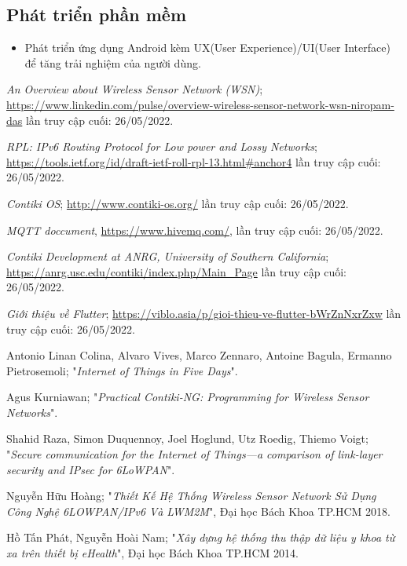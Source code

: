 \documentclass{report}
\begin{document}
\subsection{Phát triển phần mềm}
\begin{itemize}
	\item Phát triển ứng dụng Android kèm UX(User Experience)/UI(User Interface) để tăng trải nghiệm của người dùng.
\end{itemize}
\newpage
\begin{thebibliography}{80}
\textit{An Overview about Wireless Sensor Network (WSN)}; \url{https://www.linkedin.com/pulse/overview-wireless-sensor-network-wsn-niropam-das} lần truy cập cuối: 26/05/2022.

\textit{RPL: IPv6 Routing Protocol for Low power and Lossy Networks}; \url{https://tools.ietf.org/id/draft-ietf-roll-rpl-13.html#anchor4} lần truy cập cuối: 26/05/2022.

\textit{Contiki OS}; \url{http://www.contiki-os.org/} lần truy cập cuối: 26/05/2022.

\textit{MQTT doccument}, \url{https://www.hivemq.com/}, lần truy cập cuối: 26/05/2022.

\textit{Contiki Development at ANRG, University of Southern California}; \url{https://anrg.usc.edu/contiki/index.php/Main_Page} lần truy cập cuối: 26/05/2022.

\textit{Giới thiệu về Flutter}; \url{https://viblo.asia/p/gioi-thieu-ve-flutter-bWrZnNxrZxw} lần truy cập cuối: 26/05/2022.

Antonio Linan Colina, Alvaro Vives, Marco Zennaro, Antoine Bagula, Ermanno Pietrosemoli; "\textit{Internet of Things in Five Days}".

Agus Kurniawan; "\textit{Practical Contiki-NG: Programming for Wireless Sensor Networks}".

Shahid Raza, Simon Duquennoy, Joel Hoglund, Utz Roedig, Thiemo Voigt; "\textit{Secure communication for the Internet of Things—a comparison of link-layer security and IPsec for 6LoWPAN}".

Nguyễn Hữu Hoàng; "\textit{Thiết Kế Hệ Thống Wireless Sensor Network Sử Dụng Công Nghệ 6LOWPAN/IPv6 Và LWM2M}", Đại học Bách Khoa TP.HCM 2018.

Hồ Tấn Phát, Nguyễn Hoài Nam; "\textit{Xây dựng hệ thống thu thập dữ liệu y khoa từ xa trên thiết bị
	eHealth}", Đại học Bách Khoa TP.HCM 2014.

\end{thebibliography}
\end{document}
